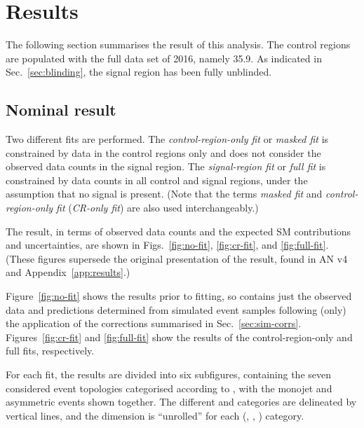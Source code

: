\section{Results}
\label{sec:results}

The following section summarises the result of this analysis. The
control regions are populated with the full data set of 2016, namely
35.9\fbinv. As indicated in Sec.~\ref{sec:blinding}, the signal region
has been fully unblinded.

\subsection{Nominal result}
\label{sec:nominal-result}

Two different fits are performed. The {\it control-region-only fit} or
{\it masked fit} is constrained by data in the control regions only
and does not consider the observed data counts in the signal
region. The {\it signal-region fit} or {\it full fit} is constrained
by data counts in all control and signal regions, under the assumption
that no signal is present.  (Note that the terms {\it masked fit} and
{\it control-region-only fit} ({\it CR-only fit}) are also used
interchangeably.)

The result, in terms of observed data counts and the expected SM
contributions and uncertainties, are shown in Figs.~\ref{fig:no-fit},
\ref{fig:cr-fit}, and \ref{fig:full-fit}. (These figures supersede the
original presentation of the result, found in AN v4 and
Appendix~\ref{app:results}.)

Figure~\ref{fig:no-fit} shows the results prior to fitting, so
contains just the observed data and predictions determined from
simulated event samples following (only) the application of the
corrections summarised in
Sec.~\ref{sec:sim-corrs}. Figures~\ref{fig:cr-fit} and
\ref{fig:full-fit} show the results of the control-region-only and
full fits, respectively.

For each fit, the results are divided into six subfigures, containing
the seven considered event topologies categorised according to \njet,
with the monojet and asymmetric events shown together. The different
\nb and \scalht categories are delineated by vertical lines, and the
\mht dimension is ``unrolled'' for each (\njet, \nb, \scalht)
category.

